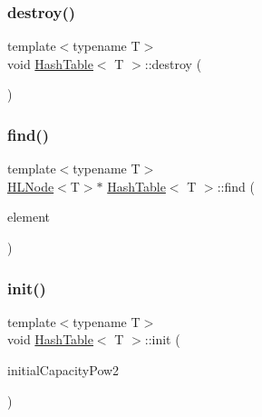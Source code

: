 \mbox{\label{classHashTable_aa296056d4ceede53c73ca0b6221aa5e2}} 
\subsubsection{\texorpdfstring{destroy()}{destroy()}}
{\footnotesize\ttfamily template$<$typename T$>$ \\
void \hyperlink{classHashTable}{Hash\+Table}$<$ T $>$\+::destroy (\begin{DoxyParamCaption}{ }\end{DoxyParamCaption})\hspace{0.3cm}{\ttfamily [inline]}}

\mbox{\label{classHashTable_a33acb23f2c3b2111811f4ba068cf585e}} 
\subsubsection{\texorpdfstring{find()}{find()}}
{\footnotesize\ttfamily template$<$typename T$>$ \\
\hyperlink{classHLNode}{H\+L\+Node}$<$T$>$$\ast$ \hyperlink{classHashTable}{Hash\+Table}$<$ T $>$\+::find (\begin{DoxyParamCaption}\item[{const T \&}]{element }\end{DoxyParamCaption})\hspace{0.3cm}{\ttfamily [inline]}}

\mbox{\label{classHashTable_a1c4b10294609ef8f7d826769841c2da4}} 
\subsubsection{\texorpdfstring{init()}{init()}}
{\footnotesize\ttfamily template$<$typename T$>$ \\
void \hyperlink{classHashTable}{Hash\+Table}$<$ T $>$\+::init (\begin{DoxyParamCaption}\item[{const long long}]{initial\+Capacity\+Pow2 }\end{DoxyParamCaption})\hspace{0.3cm}{\ttfamily [inline]}}

